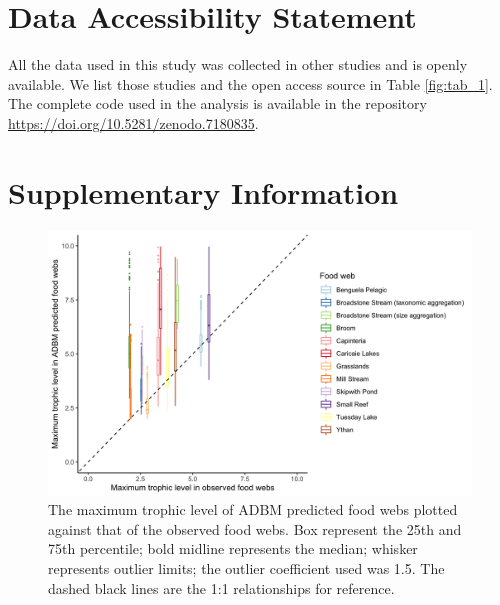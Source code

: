 \documentclass{article}
\begin{document}
\hypertarget{data-accessibility-statement}{%
\section{Data Accessibility
Statement}\label{data-accessibility-statement}}

All the data used in this study was collected in other studies and is
openly available. We list those studies and the open access source in
Table \ref{fig:tab_1}. The complete code used in the analysis is
available in the repository
\url{https://doi.org/10.5281/zenodo.7180835}.

\hypertarget{supplementary-information}{%
\section{Supplementary Information}\label{supplementary-information}}

\begin{figure}[H]

{\centering \includegraphics[width=450px]{../results/plot_max_tl_ADBM_vs_emp} 

}

\caption{\label{fig:fig_a1} The maximum trophic level of ADBM predicted food webs plotted against that of the observed food webs. Box represent the 25th and 75th percentile; bold midline represents the median; whisker represents outlier limits; the outlier coefficient used was 1.5. The dashed black lines are the 1:1 relationships for reference.}\label{fig:unnamed-chunk-7}
\end{figure}
\end{document}
